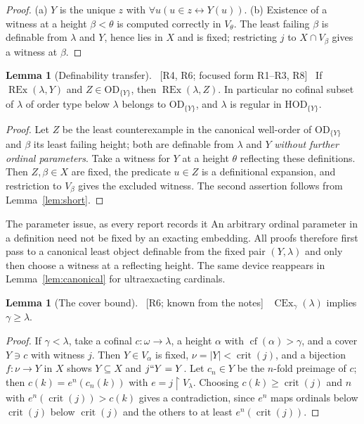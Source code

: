 \documentclass[11pt,letterpaper]{article}
\theoremstyle{definition}
\newtheorem{lemma}[definition]{Lemma}
\numberwithin{equation}{section}
\newcommand{\HOD}{\mathrm{HOD}}
\newcommand{\OD}{\mathrm{OD}}
\newcommand{\CEx}{\operatorname{CEx}}
\newcommand{\REx}{\operatorname{REx}}
\newcommand{\crit}{\operatorname{crit}}
\newcommand{\cf}{\operatorname{cf}}
\newcommand{\restr}{\mathbin{\upharpoonright}}
\newcommand{\src}[1]{\unskip\ {\normalfont\small\sffamily\color{Olive}[#1]}\ }
\begin{document}
\begin{proof}
(a) $Y$ is the unique $z$ with $\forall u(u\in z\leftrightarrow Y(u))$. (b) Existence of a witness at a height $\beta<\theta$ is computed correctly in $V_\theta$. The least failing $\beta$ is definable from $\lambda$ and $Y$, hence lies in $X$ and is fixed; restricting $j$ to $X\cap V_\beta$ gives a witness at $\beta$.
\end{proof}

\begin{lemma}[Definability transfer]\label{lem:transfer}\src{R4, R6; focused form R1--R3, R8}
If $\REx(\lambda,Y)$ and $Z\in\OD_{\{Y\}}$, then $\REx(\lambda,Z)$. In particular no cofinal subset of $\lambda$ of order type below $\lambda$ belongs to $\OD_{\{Y\}}$, and $\lambda$ is regular in $\HOD_{\{Y\}}$.
\end{lemma}

\begin{proof}
Let $Z$ be the least counterexample in the canonical well-order of $\OD_{\{Y\}}$ and $\beta$ its least failing height; both are definable from $\lambda$ and $Y$ \emph{without further ordinal parameters}. Take a witness for $Y$ at a height $\theta$ reflecting these definitions. Then $Z,\beta\in X$ are fixed, the predicate $u\in Z$ is a definitional expansion, and restriction to $V_\beta$ gives the excluded witness. The second assertion follows from Lemma~\ref{lem:short}.
\end{proof}

\begin{assessment}{The parameter issue, as every report records it}
An arbitrary ordinal parameter in a definition need not be fixed by an exacting embedding. All proofs therefore first pass to a canonical least object definable from the fixed pair $(Y,\lambda)$ and only then choose a witness at a reflecting height. The same device reappears in Lemma~\ref{lem:canonical} for ultraexacting cardinals.
\end{assessment}

\begin{lemma}[The cover bound]\label{lem:bound}\src{R6; known from the notes}
$\CEx_\gamma(\lambda)$ implies $\gamma\ge\lambda$.
\end{lemma}

\begin{proof}
If $\gamma<\lambda$, take a cofinal $c:\omega\to\lambda$, a height $\alpha$ with $\cf(\alpha)>\gamma$, and a cover $Y\ni c$ with witness $j$. Then $Y\in V_\alpha$ is fixed, $\nu=|Y|<\crit(j)$, and a bijection $f:\nu\to Y$ in $X$ shows $Y\subseteq X$ and $j``Y=Y$. Let $c_n\in Y$ be the $n$-fold preimage of $c$; then $c(k)=e^n(c_n(k))$ with $e=j\restr V_\lambda$. Choosing $c(k)\ge\crit(j)$ and $n$ with $e^n(\crit(j))>c(k)$ gives a contradiction, since $e^n$ maps ordinals below $\crit(j)$ below $\crit(j)$ and the others to at least $e^n(\crit(j))$.
\end{proof}
\end{document}
